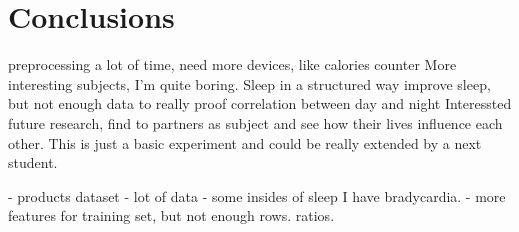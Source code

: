 \section{Conclusions}
	preprocessing a lot of time, 
	need more devices, like calories counter
	More interesting subjects, I'm quite boring. 
	Sleep in a structured way improve sleep, 
		but not enough data to really proof correlation between day and night
	Interessted future research, find to partners as subject and see how their lives influence each other.
	This is just a basic experiment and could be really extended by a next student.


	- products dataset
	- lot of data
	-  some insides of sleep
	I have bradycardia. 
	- more features for training set, but not enough rows. ratios.
